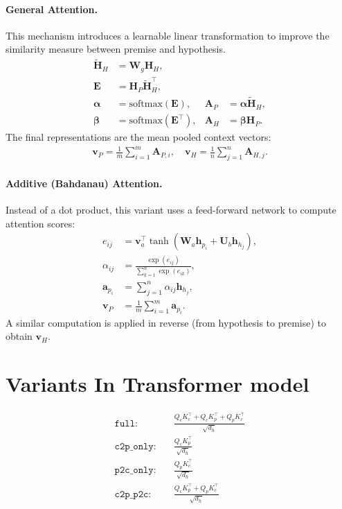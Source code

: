 \documentclass[11pt]{article}
\begin{document}
\paragraph{General Attention.}
This mechanism introduces a learnable linear transformation to improve 
the similarity measure between premise and hypothesis.
\begin{align}
\tilde{\mathbf{H}}_H &= \mathbf{W}_g \mathbf{H}_H, \\
\mathbf{E} &= \mathbf{H}_P \tilde{\mathbf{H}}_H^\top, \\
\boldsymbol{\alpha} &= \mathrm{softmax}(\mathbf{E}), &
\mathbf{A}_P &= \boldsymbol{\alpha} \tilde{\mathbf{H}}_H, \\
\boldsymbol{\beta} &= \mathrm{softmax}(\mathbf{E}^\top), &
\mathbf{A}_H &= \boldsymbol{\beta} \mathbf{H}_P.
\end{align}
The final representations are the mean pooled context vectors:
\begin{align}
\mathbf{v}_P = \frac{1}{m}\sum_{i=1}^m \mathbf{A}_{P,i}, \quad
\mathbf{v}_H = \frac{1}{n}\sum_{j=1}^n \mathbf{A}_{H,j}.
\end{align}
\paragraph{Additive (Bahdanau) Attention.}
Instead of a dot product, this variant uses a feed-forward network to 
compute attention scores:
\begin{align}
e_{ij} &= \mathbf{v}_a^\top \tanh(\mathbf{W}_a \mathbf{h}_{p_i} + \mathbf{U}_b \mathbf{h}_{h_j}), \\
\alpha_{ij} &= \frac{\exp(e_{ij})}{\sum_{k=1}^{n} \exp(e_{ik})}, \\
\mathbf{a}_{p_i} &= \sum_{j=1}^{n} \alpha_{ij} \mathbf{h}_{h_j}, \\
\mathbf{v}_P &= \frac{1}{m}\sum_{i=1}^{m} \mathbf{a}_{p_i}.
\end{align}
A similar computation is applied in reverse (from hypothesis to premise)
to obtain $\mathbf{v}_H$.
\section {Variants In Transformer model}
\begin{equation}
\begin{aligned}
\texttt{full:}\quad    & \frac{Q_c K_c^\top + Q_c K_p^\top + Q_p K_c^\top}{\sqrt{d_h}} \\[2pt]
\texttt{c2p\_only:}\quad& \frac{Q_c K_p^\top}{\sqrt{d_h}} \\[2pt]
\texttt{p2c\_only:}\quad& \frac{Q_p K_c^\top}{\sqrt{d_h}} \\[2pt]
\texttt{c2p\_p2c:}\quad & \frac{Q_c K_p^\top + Q_p K_c^\top}{\sqrt{d_h}}
\end{aligned}
\label{eq:attn-ablation-forms}
\end{equation}
\end{document}
